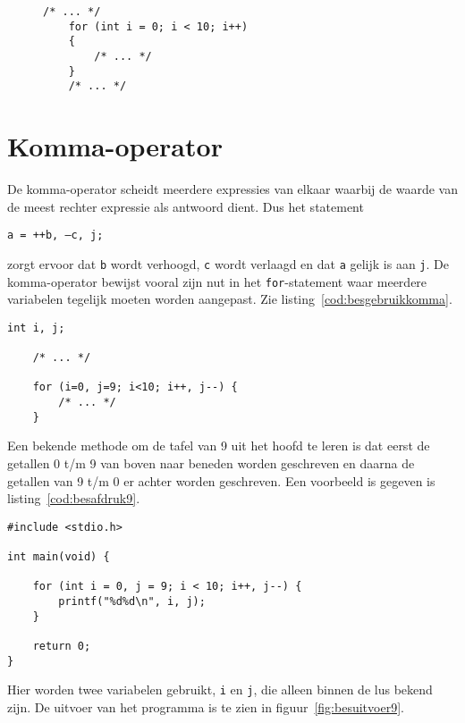 \begin{figure}[!ht]
\begin{lstlisting}[caption=Gebruik van de increment-operator in een \texttt{for}-statement.,label=cod:besforwithinc]
    /* ... */
    for (int i = 0; i < 10; i++)
    {
        /* ... */
    }
    /* ... */
\end{lstlisting}
\end{figure}


\section{Komma-operator}
\indexfunc{,}
De komma-operator scheidt meerdere expressies van elkaar waarbij de waarde van de meest rechter expressie als antwoord dient. Dus het statement

\hspace*{1em}\texttt{a = ++b, --c, j;}

zorgt ervoor dat \texttt{b} wordt verhoogd, \texttt{c} wordt verlaagd en dat \texttt{a} gelijk is aan \texttt{j}. De komma-operator bewijst vooral zijn nut in het \texttt{for}-statement waar meerdere variabelen tegelijk moeten worden aangepast. Zie listing~\ref{cod:besgebruikkomma}.

\begin{lstlisting}[caption=Gebruik van de komma-operator.,label=cod:besgebruikkomma]
    int i, j;
    
    /* ... */
    
    for (i=0, j=9; i<10; i++, j--) {
        /* ... */
    }
\end{lstlisting}

Een bekende methode om de tafel van 9 uit het hoofd te leren is dat eerst de getallen 0 t/m 9 van boven naar beneden worden geschreven en daarna de getallen van 9 t/m 0 er achter worden geschreven. Een voorbeeld is gegeven is listing~\ref{cod:besafdruk9}.


\begin{lstlisting}[caption=Afdrukken van de tafel van 9.,label=cod:besafdruk9]
#include <stdio.h>

int main(void) {

	for (int i = 0, j = 9; i < 10; i++, j--) {
		printf("%d%d\n", i, j);
	}

	return 0;
}
\end{lstlisting}

Hier worden twee variabelen gebruikt, \texttt{i} en \texttt{j}, die alleen binnen de lus bekend zijn. De uitvoer van het programma is te zien in figuur~\ref{fig:besuitvoer9}.


